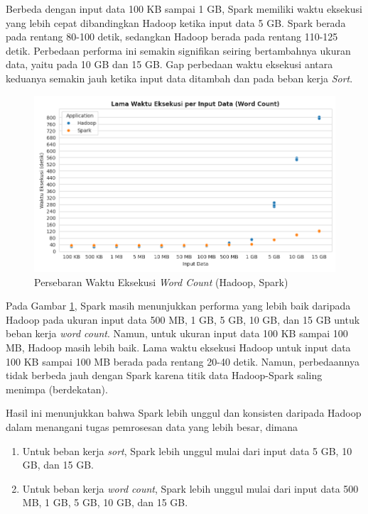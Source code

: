 Berbeda dengan input data 100 KB sampai 1 GB, Spark memiliki waktu eksekusi yang lebih cepat dibandingkan Hadoop ketika input data 5 GB. Spark berada pada rentang 80-100 detik, sedangkan Hadoop berada pada rentang 110-125 detik. Perbedaan performa ini semakin signifikan seiring bertambahnya ukuran data, yaitu pada 10 GB dan 15 GB. Gap perbedaan waktu eksekusi antara keduanya semakin jauh ketika input data ditambah dan pada beban kerja \textit{Sort}. 

\begin{figure}[h]
    \centering
    \includegraphics[width=1\textwidth]{figures/ch04/1-lama-waktu-eksekusi-wordcount.png}
    \caption{Persebaran Waktu Eksekusi \textit{Word Count} (Hadoop, Spark)}
    \label{fig:lama-waktu-eksekusi-wordcount}
\end{figure}

Pada Gambar \ref{fig:lama-waktu-eksekusi-wordcount}, Spark masih menunjukkan performa yang lebih baik daripada Hadoop pada ukuran input data 500 MB, 1 GB, 5 GB, 10 GB, dan 15 GB untuk beban kerja \textit{word count}. Namun, untuk ukuran input data 100 KB sampai 100 MB, Hadoop masih lebih baik. Lama waktu eksekusi Hadoop untuk input data 100 KB sampai 100 MB berada pada rentang 20-40 detik. Namun, perbedaannya tidak berbeda jauh dengan Spark karena titik data Hadoop-Spark saling menimpa (berdekatan).  

Hasil ini menunjukkan bahwa Spark lebih unggul dan konsisten daripada Hadoop dalam menangani tugas pemrosesan data yang lebih besar, dimana
\begin{enumerate}
	\item Untuk beban kerja \textit{sort}, Spark lebih unggul mulai dari input data 5 GB, 10 GB, dan 15 GB.
	\item Untuk beban kerja \textit{word count}, Spark lebih unggul mulai dari input data 500 MB, 1 GB, 5 GB, 10 GB, dan 15 GB. 
\end{enumerate}

